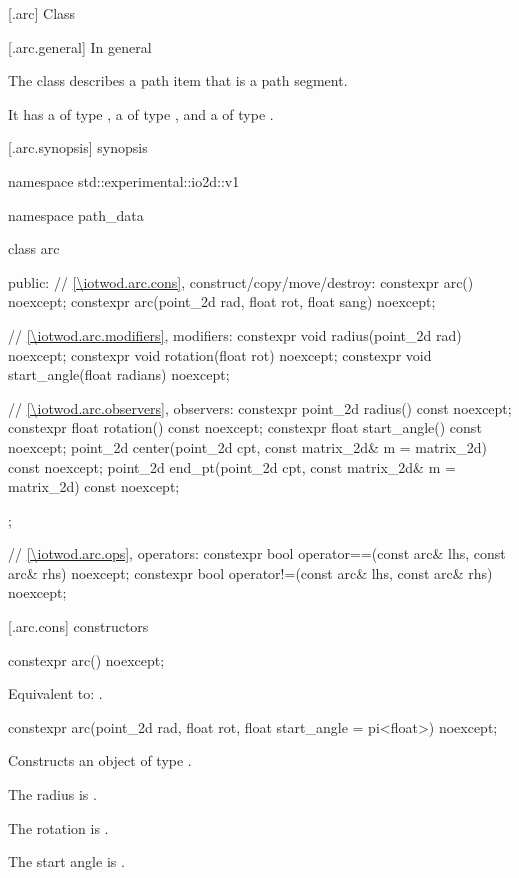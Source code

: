  [\iotwod.arc] {Class }

 [\iotwod.arc.general] {In general}

\pnum
{}%
The class  describes a path item that is a path segment.

\pnum
It has a  of type , a  of type , and a  of type .

 [\iotwod.arc.synopsis] { synopsis}

\begin{codeblock}
namespace std::experimental::io2d::v1 {
  namespace path_data {
    class arc {
    public:
      // \ref{\iotwod.arc.cons}, construct/copy/move/destroy:
      constexpr arc() noexcept;
      constexpr arc(point_2d rad,
        float rot, float sang) noexcept;

      // \ref{\iotwod.arc.modifiers}, modifiers:
      constexpr void radius(point_2d rad) noexcept;
      constexpr void rotation(float rot) noexcept;
      constexpr void start_angle(float radians) noexcept;

      // \ref{\iotwod.arc.observers}, observers:
      constexpr point_2d radius() const noexcept;
      constexpr float rotation() const noexcept;
      constexpr float start_angle() const noexcept;
      point_2d center(point_2d cpt, const matrix_2d& m = matrix_2d{}) 
        const noexcept;
      point_2d end_pt(point_2d cpt, const matrix_2d& m = matrix_2d{}) 
        const noexcept;
    };
    
    // \ref{\iotwod.arc.ops}, operators:
    constexpr bool operator==(const arc& lhs, const arc& rhs) noexcept;
    constexpr bool operator!=(const arc& lhs, const arc& rhs) noexcept;
  }
}
\end{codeblock}

 [\iotwod.arc.cons] { constructors}

%
\begin{itemdecl}
constexpr arc() noexcept;
\end{itemdecl}
\begin{itemdescr}
\pnum
\effects
Equivalent to: .
\end{itemdescr}

%
\begin{itemdecl}
constexpr arc(point_2d rad, float rot,
  float start_angle = pi<float>) noexcept;
\end{itemdecl}
\begin{itemdescr}
\pnum
\effects
Constructs an object of type .

\pnum
The radius is .

\pnum
The rotation is .

\pnum
The start angle is .
\end{itemdescr}

